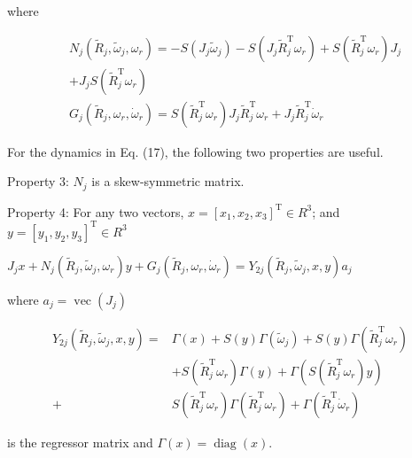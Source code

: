 \documentclass[10pt]{article}
\begin{document}
where

$$
\begin{aligned}
& N_{j}\left(\tilde{R}_{j}, \tilde{\omega}_{j}, \omega_{r}\right)=-S\left(J_{j} \tilde{\omega}_{j}\right)-S\left(J_{j} \tilde{R}_{j}^{\mathrm{T}} \omega_{r}\right)+S\left(\tilde{R}_{j}^{\mathrm{T}} \omega_{r}\right) J_{j} \\
&+J_{j} S\left(\tilde{R}_{j}^{\mathrm{T}} \omega_{r}\right) \\
& G_{j}\left(\tilde{R}_{j}, \omega_{r}, \dot{\omega}_{r}\right)=S\left(\tilde{R}_{j}^{\mathrm{T}} \omega_{r}\right) J_{j} \tilde{R}_{j}^{\mathrm{T}} \omega_{r}+J_{j} \tilde{R}_{j}^{\mathrm{T}} \dot{\omega}_{r}
\end{aligned}
$$

For the dynamics in Eq. (17), the following two properties are useful.

Property 3: $N_{j}$ is a skew-symmetric matrix.

Property 4: For any two vectors, $x=\left[x_{1}, x_{2}, x_{3}\right]^{\mathrm{T}} \in R^{3}$; and $y=\left[y_{1}, y_{2}, y_{3}\right]^{\mathrm{T}} \in R^{3}$

$J_{j} x+N_{j}\left(\tilde{R}_{j}, \tilde{\omega}_{j}, \omega_{r}\right) y+G_{j}\left(\tilde{R}_{j}, \omega_{r}, \dot{\omega}_{r}\right)=Y_{2 j}\left(\tilde{R}_{j}, \tilde{\omega}_{j}, x, y\right) a_{j}$

where $a_{j}=\operatorname{vec}\left(J_{j}\right)$

$$
\begin{aligned}
Y_{2 j}\left(\tilde{R}_{j}, \tilde{\omega}_{j}, x, y\right)= & \Gamma(x)+S(y) \Gamma\left(\tilde{\omega}_{j}\right)+S(y) \Gamma\left(\tilde{R}_{j}^{\mathrm{T}} \omega_{r}\right) \\
& +S\left(\tilde{R}_{j}^{\mathrm{T}} \omega_{r}\right) \Gamma(y)+\Gamma\left(S\left(\tilde{R}_{j}^{\mathrm{T}} \omega_{r}\right) y\right) \\
+ & S\left(\tilde{R}_{j}^{\mathrm{T}} \omega_{r}\right) \Gamma\left(\tilde{R}_{j}^{\mathrm{T}} \omega_{r}\right)+\Gamma\left(\tilde{R}_{j}^{\mathrm{T}} \dot{\omega}_{r}\right)
\end{aligned}
$$

is the regressor matrix and $\Gamma(x)=\operatorname{diag}(x)$.
\end{document}
